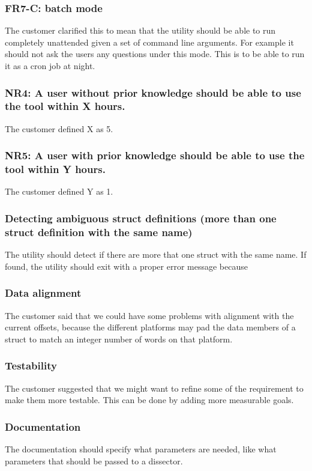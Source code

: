 \subsubsection{FR7-C: \Gls{batch mode}}
The customer clarified this to mean that the \gls{utility} should be able to run completely unattended given a set of command line arguments. For example it should not ask the users any questions under this mode. This is to be able to run it as a \gls{cron} job at night.

\subsubsection{NR4: A user without prior knowledge should be able to use the tool within X hours.}
The customer defined X as 5.

\subsubsection{NR5: A user with prior knowledge should be able to use the tool within Y hours.}
The customer defined Y as 1.

\subsubsection{Detecting ambiguous \gls{struct} definitions (more than one \gls{struct} definition with the same name)}
The \gls{utility} should detect if there are more that one \gls{struct} with the same name. If found, the \gls{utility} should exit with a proper error message because 

\subsubsection{Data alignment}
The customer said that we could have some problems with alignment with the current offsets, because the different platforms may pad the data \glspl{member} of a \gls{struct} to match an \gls{integer} number of words on that platform.

\subsubsection{Testability}
The customer suggested that we might want to refine some of the requirement to make them more testable. This can be done by adding more measurable goals.

\subsubsection{Documentation}
The documentation should specify what parameters are needed, like what parameters that should be passed to a \gls{dissector}.

